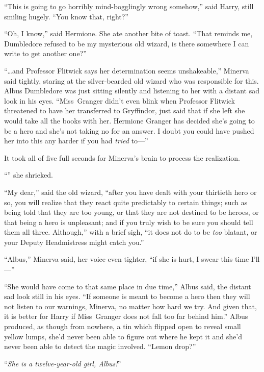“This is going to go horribly mind-bogglingly wrong somehow,” said Harry, still smiling hugely. “You know that, right?”

“Oh, I know,” said Hermione. She ate another bite of toast. “That reminds me, Dumbledore refused to be my mysterious old wizard, is there somewhere I can write to get another one?”


“…and Professor Flitwick says her determination seems unshakeable,” Minerva said tightly, staring at the silver-bearded old wizard who was responsible for this. Albus Dumbledore was just sitting silently and listening to her with a distant sad look in his eyes. “Miss~Granger didn’t even blink when Professor Flitwick threatened to have her transferred to Gryffindor, just said that if she left she would take all the books with her. Hermione Granger has decided she’s going to be a hero and she’s not taking no for an answer. I doubt you could have pushed her into this any harder if you had \emph{tried} to—”

It took all of five full seconds for Minerva’s brain to process the realization.

“” she shrieked.

“My dear,” said the old wizard, “after you have dealt with your thirtieth hero or so, you will realize that they react quite predictably to certain things; such as being told that they are too young, or that they are not destined to be heroes, or that being a hero is unpleasant; and if you truly wish to be sure you should tell them all three. Although,” with a brief sigh, “it does not do to be \emph{too} blatant, or your Deputy Headmistress might catch you.”

“Albus,” Minerva said, her voice even tighter, “if she is hurt, I swear this time I’ll—”

“She would have come to that same place in due time,” Albus said, the distant sad look still in his eyes. “If someone is meant to become a hero then they will not listen to our warnings, Minerva, no matter how hard we try. And given that, it is better for Harry if Miss~Granger does not fall too far behind him.” Albus produced, as though from nowhere, a tin which flipped open to reveal small yellow lumps, she’d never been able to figure out where he kept it and she’d never been able to detect the magic involved. “Lemon drop?”

“\emph{She is a twelve-year-old girl, Albus!}”


